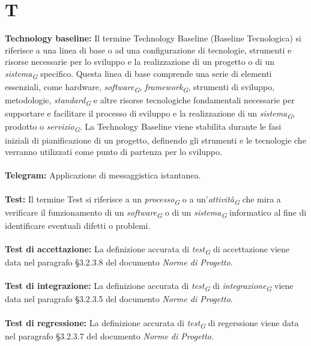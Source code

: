 \documentclass{article}
\begin{document}
\section*{T}
{}
\textbf{Technology baseline:} Il termine Technology Baseline (Baseline Tecnologica) si riferisce a una linea di base o ad una configurazione di tecnologie, strumenti e risorse necessarie per lo sviluppo e la realizzazione di un progetto o di un \textit{sistema}\textsubscript{\textit{G}} specifico. Questa linea di base comprende una serie di elementi essenziali, come hardware, \textit{software}\textsubscript{\textit{G}}, \textit{framework}\textsubscript{\textit{G}}, strumenti di sviluppo, metodologie, \textit{standard}\textsubscript{\textit{G}} e altre risorse tecnologiche fondamentali necessarie per supportare e facilitare il processo di sviluppo e la realizzazione di un \textit{sistema}\textsubscript{\textit{G}}, prodotto o \textit{servizio}\textsubscript{\textit{G}}. La Technology Baseline viene stabilita durante le fasi iniziali di pianificazione di un progetto, definendo gli strumenti e le tecnologie che verranno utilizzati come punto di partenza per lo sviluppo.
\\
\\
\textbf{Telegram:} Applicazione di messaggistica istantanea.
\\
\\
\textbf{Test:} Il termine Test si riferisce a un \textit{processo}\textsubscript{\textit{G}} o a un'\textit{attività}\textsubscript{\textit{G}} che mira a verificare il funzionamento di un \textit{software}\textsubscript{\textit{G}} o di un \textit{sistema}\textsubscript{\textit{G}} informatico al fine di identificare eventuali difetti o problemi.
\\
\\
\textbf{Test di accettazione:} La definizione accurata di \textit{test}\textsubscript{\textit{G}} di accettazione viene data nel paragrafo §3.2.3.8 del documento \textit{Norme di Progetto}.
\\
\\
\textbf{Test di integrazione:}  La definizione accurata di \textit{test}\textsubscript{\textit{G}} di \textit{integrazione}\textsubscript{\textit{G}} viene data nel paragrafo §3.2.3.5 del documento \textit{Norme di Progetto}.
\\
\\
\textbf{Test di regressione:}  La definizione accurata di \textit{test}\textsubscript{\textit{G}} di regerssione viene data nel paragrafo §3.2.3.7 del documento \textit{Norme di Progetto}.
\end{document}
